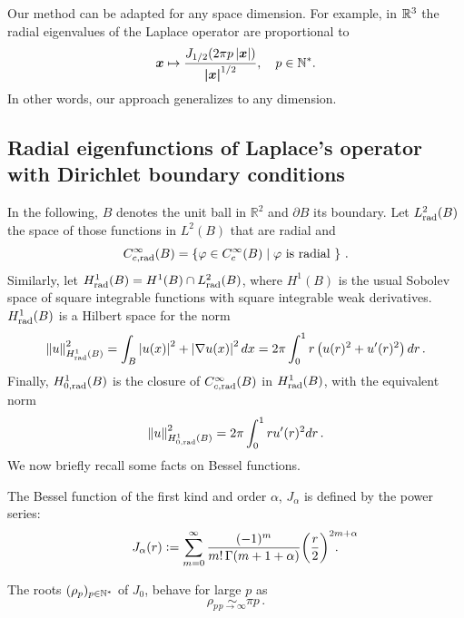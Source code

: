 \documentclass[main]{subfiles}
\begin{document}
Our method can be adapted for any space dimension. For example, in $\mathbb{R}^3$ the radial eigenvalues of the Laplace operator are proportional to
\[  \boldsymbol{x} \mapsto \dfrac{J_{1/2}(2\pi p\left\lvert \boldsymbol{x} \right\rvert)}{\boldsymbol{|x|}^{1/2}}, \quad  p\in\mathbb{N}^*.\] 
In other words, our approach generalizes \cite{Alouges2015} to any dimension.  
\subsection{Radial eigenfunctions of Laplace's operator with Dirichlet boundary conditions}
\label{FunctionalFramework}
In the following, $B$ denotes the unit ball in $\mathbb{R}^2$ and $\partial B$ its boundary. Let $L^2_{\textup{rad}}(B)$ the space of those functions in $L^2(B)$ that are radial and 
$$C^\infty_{c,\textup{rad}}(B) = \left\{\varphi \in C^{\infty}_c(B)\mathrel{}\middle|\mathrel{}\varphi \text{ is radial }\right\}\,.$$
Similarly, let $H^1_{\textup{rad}}(B) = H^1(B) \cap L^2_{\textup{rad}}(B)$, where $H^1(B)$ is the usual Sobolev space of square integrable functions with square integrable weak derivatives. $H^1_{\textup{rad}}(B)$ is a Hilbert space for the norm
\[\left\|u\right\|_{H^1_{\textup{rad}}(B)}^2 = \int_{B}\left\lvert u(x) \right\rvert^2 + \left\lvert \nabla u(x) \right\rvert^2dx = 2\pi\int_{0}^1 r \left(u(r)^2 + u'(r)^2\right) dr \,. \]
Finally, $H^1_{0,\textup{rad}}(B)$ is the closure of $C^\infty_{c,\textup{rad}}(B)$ in $H^1_{\textup{rad}}(B)$, with the equivalent norm
\[\left\|u\right\|_{H^1_{0,\textup{rad}}(B)}^2 = {2\pi \int_{0}^1 r u'(r)^2dr}\,.\] 
\noindent We now briefly recall some facts on Bessel functions. 
\begin{definition}
	\label{defJ0}
	The Bessel function of the first kind and order $\alpha$, $J_\alpha$ is defined by the power series: 
	\begin{equation}
	\label{J0powerSeries}
	J_\alpha(r) \isdef \sum_{m=0}^\infty \frac{(-1)^m}{m! \, \Gamma(m+1+\alpha)} {\bigg(\frac{r}{2}\bigg)}^{2m+\alpha}\!\!\!\!\!\!\!\!\!\!\!\! \,.
	\end{equation}
\end{definition}
The roots $(\rho_p)_{p \in \mathbb{N}^*}$ of $J_0$, behave for large $p$ as 
\[ \rho_p \underset{p \to \infty}{\sim} \pi p\,.\]
\end{document}
